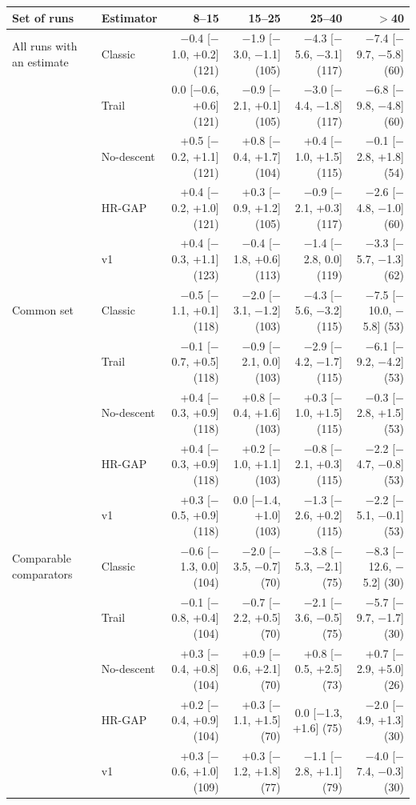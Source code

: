 \begin{tabular}{@{}llrrrr@{}}
\toprule
Set of runs & Estimator & 8--15 & 15--25 & 25--40 & $>$40 \\
\midrule
All runs with an estimate & Classic & $-$0.4 [$-$1.0, +0.2] (121) & $-$1.9 [$-$3.0, $-$1.1] (105) & $-$4.3 [$-$5.6, $-$3.1] (117) & $-$7.4 [$-$9.7, $-$5.8] (60) \\
 & Trail & 0.0 [$-$0.6, +0.6] (121) & $-$0.9 [$-$2.1, +0.1] (105) & $-$3.0 [$-$4.4, $-$1.8] (117) & $-$6.8 [$-$9.8, $-$4.8] (60) \\
 & No-descent & +0.5 [$-$0.2, +1.1] (121) & +0.8 [$-$0.4, +1.7] (104) & +0.4 [$-$1.0, +1.5] (115) & $-$0.1 [$-$2.8, +1.8] (54) \\
 & HR-GAP & +0.4 [$-$0.2, +1.0] (121) & +0.3 [$-$0.9, +1.2] (105) & $-$0.9 [$-$2.1, +0.3] (117) & $-$2.6 [$-$4.8, $-$1.0] (60) \\
 & \ascent{} v1 & +0.4 [$-$0.3, +1.1] (123) & $-$0.4 [$-$1.8, +0.6] (113) & $-$1.4 [$-$2.8, 0.0] (119) & $-$3.3 [$-$5.7, $-$1.3] (62) \\
\addlinespace[2pt]
Common set & Classic & $-$0.5 [$-$1.1, +0.1] (118) & $-$2.0 [$-$3.1, $-$1.2] (103) & $-$4.3 [$-$5.6, $-$3.2] (115) & $-$7.5 [$-$10.0, $-$5.8] (53) \\
 & Trail & $-$0.1 [$-$0.7, +0.5] (118) & $-$0.9 [$-$2.1, 0.0] (103) & $-$2.9 [$-$4.2, $-$1.7] (115) & $-$6.1 [$-$9.2, $-$4.2] (53) \\
 & No-descent & +0.4 [$-$0.3, +0.9] (118) & +0.8 [$-$0.4, +1.6] (103) & +0.3 [$-$1.0, +1.5] (115) & $-$0.3 [$-$2.8, +1.5] (53) \\
 & HR-GAP & +0.4 [$-$0.3, +0.9] (118) & +0.2 [$-$1.0, +1.1] (103) & $-$0.8 [$-$2.1, +0.3] (115) & $-$2.2 [$-$4.7, $-$0.8] (53) \\
 & \ascent{} v1 & +0.3 [$-$0.5, +0.9] (118) & 0.0 [$-$1.4, +1.0] (103) & $-$1.3 [$-$2.6, +0.2] (115) & $-$2.2 [$-$5.1, $-$0.1] (53) \\
\addlinespace[2pt]
Comparable comparators & Classic & $-$0.6 [$-$1.3, 0.0] (104) & $-$2.0 [$-$3.5, $-$0.7] (70) & $-$3.8 [$-$5.3, $-$2.1] (75) & $-$8.3 [$-$12.6, $-$5.2] (30) \\
 & Trail & $-$0.1 [$-$0.8, +0.4] (104) & $-$0.7 [$-$2.2, +0.5] (70) & $-$2.1 [$-$3.6, $-$0.5] (75) & $-$5.7 [$-$9.7, $-$1.7] (30) \\
 & No-descent & +0.3 [$-$0.4, +0.8] (104) & +0.9 [$-$0.6, +2.1] (70) & +0.8 [$-$0.5, +2.5] (73) & +0.7 [$-$2.9, +5.0] (26) \\
 & HR-GAP & +0.2 [$-$0.4, +0.9] (104) & +0.3 [$-$1.1, +1.5] (70) & 0.0 [$-$1.3, +1.6] (75) & $-$2.0 [$-$4.9, +1.3] (30) \\
 & \ascent{} v1 & +0.3 [$-$0.6, +1.0] (109) & +0.3 [$-$1.2, +1.8] (77) & $-$1.1 [$-$2.8, +1.1] (79) & $-$4.0 [$-$7.4, $-$0.3] (30) \\
\bottomrule
\end{tabular}
